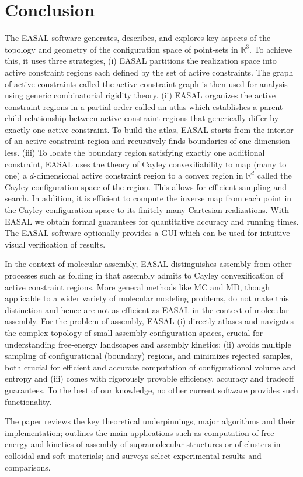 \section{Conclusion}
\label{conclusion}
The EASAL software generates, describes, and explores key aspects of the
topology and geometry of the configuration space of point-sets in
$\mathbb{R}^3$. To achieve this, it uses three strategies, (i) EASAL partitions
the realization space into active constraint regions each defined by the set of
active constraints. The graph of active constraints called the active
constraint graph is then used for analysis using generic combinatorial rigidity
theory.  (ii) EASAL organizes the active constraint regions in a partial order
called an atlas which establishes a parent child relationship between active
constraint regions that generically differ by exactly one active constraint.
To build the atlas, EASAL starts from the interior of an active constraint
region and recursively finds boundaries of one dimension less.  (iii) To locate
the boundary region satisfying exactly one additional constraint, EASAL uses
the theory of Cayley convexifiability to map (many to one) a $d$-dimensional
active constraint region to a convex region in $\mathbb{R}^d$ called the Cayley
configuration space of the region.  This allows for efficient sampling and
search. In addition, it is efficient to compute the inverse map from each point
in the Cayley configuration space to its finitely many Cartesian realizations.
With EASAL we obtain formal guarantees for quantitative accuracy and running
times.  The EASAL software optionally provides a GUI which can be used for
intuitive visual verification of results.

In the context of molecular assembly, EASAL distinguishes assembly from other
processes such as folding in that assembly admits to Cayley convexification of
active constraint regions. More general methods like MC and MD, though
applicable to a wider variety of molecular modeling problems, do not make this
distinction and hence are not as efficient as EASAL in the context of molecular
assembly.  For the problem of assembly, EASAL (i) directly atlases and
navigates the complex topology of small assembly configuration spaces, crucial
for understanding free-energy landscapes and assembly kinetics; (ii) avoids
multiple sampling of configurational (boundary) regions, and minimizes rejected
samples, both crucial for efficient and accurate computation of configurational
volume and entropy and (iii) comes with rigorously provable efficiency,
accuracy and tradeoff guarantees. To the
best of our knowledge, no other current software provides such functionality.


The paper reviews the key theoretical underpinnings, major algorithms and their
implementation; outlines the main applications such as computation of
free energy and kinetics of assembly of supramolecular structures or of
clusters in colloidal and soft materials; and surveys select
experimental results and comparisons.  

